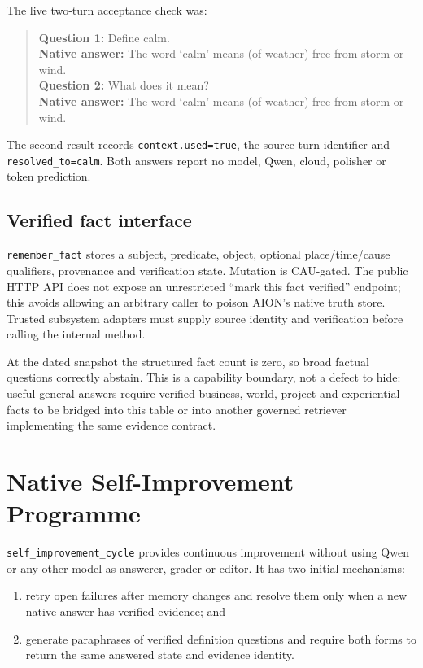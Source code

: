 \documentclass[11pt,a4paper]{article}
\begin{document}
The live two-turn acceptance check was:

\begin{quote}
\textbf{Question 1:} Define calm.\\
\textbf{Native answer:} The word `calm' means (of weather) free from storm or wind.\\[2mm]
\textbf{Question 2:} What does it mean?\\
\textbf{Native answer:} The word `calm' means (of weather) free from storm or wind.
\end{quote}

The second result records \texttt{context.used=true}, the source turn identifier and
\texttt{resolved\_to=calm}. Both answers report no model, Qwen, cloud, polisher or token
prediction.

\subsection{Verified fact interface}

\texttt{remember\_fact} stores a subject, predicate, object, optional place/time/cause
qualifiers, provenance and verification state. Mutation is CAU-gated. The public HTTP API does
not expose an unrestricted ``mark this fact verified'' endpoint; this avoids allowing an
arbitrary caller to poison AION's native truth store. Trusted subsystem adapters must supply
source identity and verification before calling the internal method.

At the dated snapshot the structured fact count is zero, so broad factual questions correctly
abstain. This is a capability boundary, not a defect to hide: useful general answers require
verified business, world, project and experiential facts to be bridged into this table or into
another governed retriever implementing the same evidence contract.

\section{Native Self-Improvement Programme}

\texttt{self\_improvement\_cycle} provides continuous improvement without using Qwen or any
other model as answerer, grader or editor. It has two initial mechanisms:

\begin{enumerate}
  \item retry open failures after memory changes and resolve them only when a new native answer
        has verified evidence; and
  \item generate paraphrases of verified definition questions and require both forms to return
        the same answered state and evidence identity.
\end{enumerate}
\end{document}
